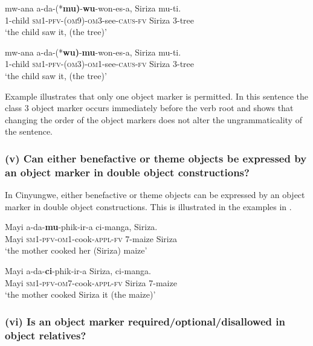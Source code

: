 \documentclass[output=paper]{langscibook}
\begin{document}
\ex\label{ex:ngunga:27b} \gll mw-ana  a-da-(*\textbf{mu)}{}-\textbf{wu}{}-won-es-a,  Siriza  mu-ti.\\
  {\textsc{}1}{}-child  {\textsc{sm1}-\textsc{pfv}}{}-{\textsc{(om9)}-}{\textsc{om}3-}see-{\textsc{caus}}{}-{\textsc{fv}}  Siriza  3-tree\\
\glt    ‘the child saw it, (the tree)’

\ex\label{ex:ngunga:27c} \gll  mw-ana  a-da-(*\textbf{wu)}{}-\textbf{mu}{}-won-es-a,  Siriza  mu-ti.\\
  {\textsc{}1}{}-child  {\textsc{sm1}-\textsc{pfv}}{}-{\textsc{(om3)}-}{\textsc{om}1-}see-{\textsc{caus}}{}-{\textsc{fv}}  Siriza  3-tree\\
\glt    ‘the child saw it, (the tree)’
    \z
\z

Example  illustrates that only one object marker is permitted. In this sentence the class 3 object marker occurs immediately before the verb root and  shows that changing the order of the object markers does not alter the ungrammaticality of the sentence. 

\subsubsection{(v) Can either benefactive or theme objects be expressed by an object marker in double object constructions?}

In Cinyungwe, either benefactive or theme objects can be expressed by an object marker in double object constructions. This is illustrated in the examples in .

\ea\label{ex:ngunga:28}
\ea\label{ex:ngunga:28a} \gll Mayi  a-da-\textbf{mu}{}-phik-ir-a    ci-manga,  Siriza.\\
Mayi  {\textsc{sm1}-\textsc{pfv}}{}-{\textsc{om}1}{}-cook-{\textsc{appl}-\textsc{fv}} 7-maize  Siriza\\
\glt ‘the mother cooked her (Siriza) maize’

\ex\label{ex:ngunga:28b} \gll Mayi  a-da-\textbf{ci}{}-phik-ir-a    Siriza,  ci-manga.\\
Mayi  {\textsc{sm1}-\textsc{pfv}}{}-{\textsc{om}7}{}-cook-{\textsc{appl}-\textsc{fv}} Siriza  7-maize  \\
\glt ‘the mother cooked Siriza it (the maize)’
\z
\z

 \subsubsection{(vi) Is an object marker required/optional/disallowed in object relatives?}
\end{document}
